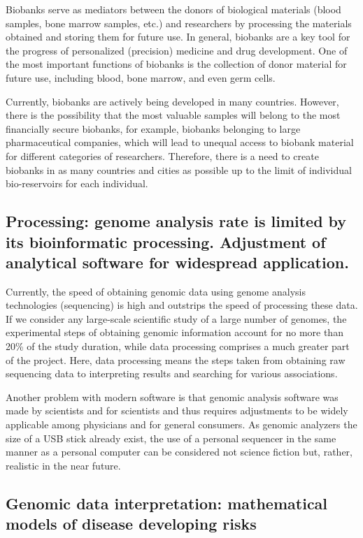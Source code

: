 Biobanks serve as mediators between the donors of biological materials (blood samples, bone marrow samples, etc.) and researchers by processing the materials obtained and storing them for future use. In general, biobanks are a key tool for the progress of personalized (precision) medicine and drug development. One of the most important functions of biobanks is the collection of donor material for future use, including blood, bone marrow, and even germ cells.

Currently, biobanks are actively being developed in many countries. However, there is the possibility that the most valuable samples will belong to the most financially secure biobanks, for example, biobanks belonging to large pharmaceutical companies, which will lead to unequal access to biobank material for different categories of researchers. Therefore, there is a need to create biobanks in as many countries and cities as possible up to the limit of individual bio-reservoirs for each individual.

\subsection[Adjustment of analytical software for widespread application]{%
  Processing: genome analysis rate is limited by its bioinformatic processing. Adjustment of analytical software for widespread application.}

Currently, the speed of obtaining genomic data using genome analysis technologies (sequencing) is high and outstrips the speed of processing these data. If we consider any large-scale scientific study of a large number of genomes, the experimental steps of obtaining genomic information account for no more than 20\% of the study duration, while data processing comprises a much greater part of the project. Here, data processing means the steps taken from obtaining raw sequencing data to interpreting results and searching for various associations.

Another problem with modern software is that genomic analysis software was made by scientists and for scientists and thus requires adjustments to be widely applicable among physicians and for general consumers. As genomic analyzers the size of a USB stick already exist, the use of a personal sequencer in the same manner as a personal computer can be considered not science fiction but, rather, realistic in the near future.

\subsection[Genomic data interpretation]{Genomic data interpretation: mathematical models of disease developing risks}

